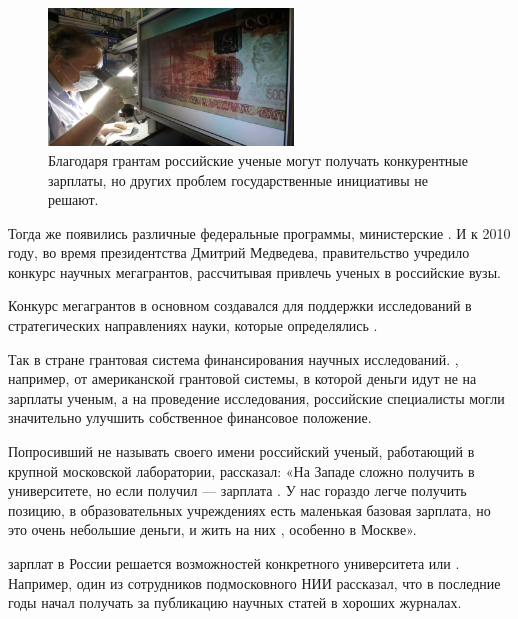 \begin{figure}
    \begin{center}
        \includegraphics[width=0.58\textwidth]{img/bigmoney.png}
    \end{center}
    \caption{Благодаря грантам российские ученые могут получать конкурентные зарплаты, но других проблем государственные инициативы не решают.}
\end{figure}
Тогда же появились различные федеральные  программы, министерские . И к 2010 году, во время президентства Дмитрий Медведева, правительство учредило конкурс научных мегагрантов, рассчитывая привлечь  ученых в российские вузы.

Конкурс мегагрантов в основном создавался для поддержки  исследований в стратегических направлениях науки, которые определялись .

Так в стране  грантовая система финансирования научных исследований. , например, от американской грантовой системы, в которой деньги идут не на зарплаты ученым, а на проведение исследования, российские специалисты могли значительно улучшить собственное финансовое положение.

Попросивший не называть своего имени российский ученый, работающий в крупной московской лаборатории, рассказал: «На Западе сложно получить  в университете, но если получил --- зарплата . У нас гораздо легче получить позицию, в образовательных учреждениях есть маленькая базовая зарплата, но это очень небольшие деньги, и жить на них , особенно в Москве».

 зарплат в России решается  возможностей конкретного университета или . Например, один из сотрудников подмосковного НИИ рассказал, что в последние годы начал получать  за публикацию научных статей в хороших журналах.

